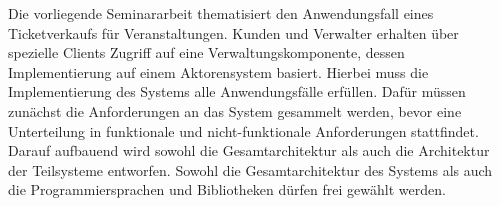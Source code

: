 Die vorliegende Seminararbeit thematisiert den Anwendungsfall eines Ticketverkaufs für Veranstaltungen.
Kunden und Verwalter erhalten über spezielle Clients Zugriff auf eine Verwaltungskomponente, dessen Implementierung auf einem Aktorensystem basiert.
Hierbei muss die Implementierung des Systems alle Anwendungsfälle erfüllen.
Dafür müssen zunächst die Anforderungen an das System gesammelt werden, bevor eine Unterteilung in funktionale und nicht-funktionale Anforderungen stattfindet.
Darauf aufbauend wird sowohl die Gesamtarchitektur als auch die Architektur der Teilsysteme entworfen.
Sowohl die Gesamtarchitektur des Systems als auch die Programmiersprachen und Bibliotheken dürfen frei gewählt werden.
